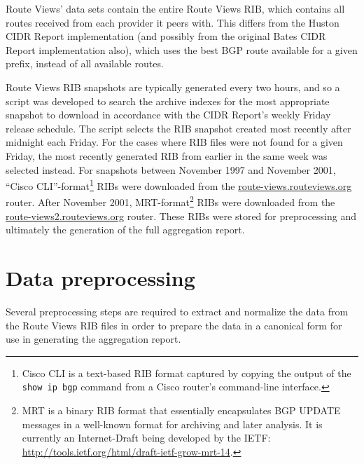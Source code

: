 Route Views' data sets contain the entire Route Views RIB, which contains all
routes received from each provider it peers with. This differs from the Huston
CIDR Report implementation \cite{Huston:2011ys} (and possibly from the original
Bates CIDR Report implementation also), which uses the best BGP route available
for a given prefix, instead of all available routes.


Route Views RIB snapshots are typically generated every two hours, and so a
script was developed to search the archive indexes for the most appropriate
snapshot to download in accordance with the CIDR Report's weekly Friday release
schedule. The script selects the RIB snapshot created most recently after
midnight each Friday. For the cases where RIB files were not found for a given
Friday, the most recently generated RIB from earlier in the same week was
selected instead. For snapshots between November 1997 and November
2001, ``Cisco CLI''-format\footnote{Cisco CLI is a text-based RIB
format captured by copying the output of the \texttt{show ip bgp} command from
a Cisco router's command-line interface.} RIBs were downloaded from the
\url{route-views.routeviews.org} router. After November 2001,
MRT-format\footnote{MRT is a binary RIB format that essentially encapsulates
BGP UPDATE messages in a well-known format for archiving and later analysis. It
is currently an Internet-Draft being developed by the IETF:
\url{http://tools.ietf.org/html/draft-ietf-grow-mrt-14}.} RIBs were downloaded
from the \url{route-views2.routeviews.org} router. These RIBs were stored for
preprocessing and ultimately the generation of the full aggregation report.

\section{Data preprocessing}

Several preprocessing steps are required to extract and normalize the data from
the Route Views RIB files in order to prepare the data in a canonical form for
use in generating the aggregation report.

